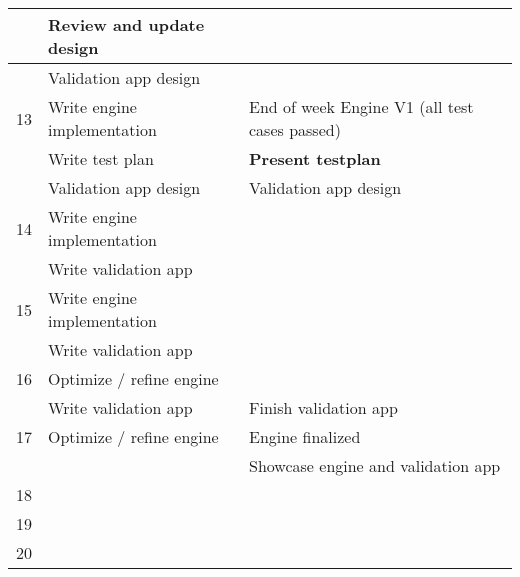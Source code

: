\documentclass{article} %
\begin{document}
\begin{longtable}{|l|p{}|p{}|}
                         & Review and update design                  &                                         \\ \hline
                         & Validation app design                     &                                         \\ \hline
    13                   & Write engine implementation               & End of week Engine V1 (all test cases passed)       \\ \hline
                         & Write test plan                           & \textbf{Present testplan}               \\ \hline
                         & Validation app design                     & Validation app design                   \\ \hline
    14                   & Write engine implementation               &                                         \\ \hline
                         & Write validation app                      &                                         \\ \hline
    15                   & Write engine implementation               &                                         \\ \hline
                         & Write validation app                      &                                         \\ \hline
    16                   & Optimize / refine engine                  &                                         \\ \hline
                         & Write validation app                      & Finish validation app                   \\ \hline
    17                   & Optimize / refine engine                  & Engine finalized                        \\ \hline
                         &                                           & Showcase engine and validation app      \\ \hline
    18                   &                                           &                                         \\ \hline
    19                   &                                           &                                         \\ \hline
    20                   &                                           &                                         \\ \hline
\end{longtable}
\newpage
\end{document}
